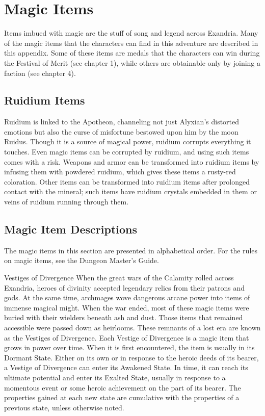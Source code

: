 \documentclass[10pt,a4,twoside,twocolumn,openany,nodeprecatedcode]{dndbook}
\begin{document}
\chapter{Magic Items}
Items imbued with magic are the stuff of song and legend across Exandria. Many of the magic items that the characters can find in this adventure are described in this appendix. Some of these items are medals that the characters can win during the Festival of Merit (see chapter 1), while others are obtainable only by joining a faction (see chapter 4).
\section{Ruidium Items}
Ruidium is linked to the Apotheon, channeling not just Alyxian's distorted emotions but also the curse of misfortune bestowed upon him by the moon Ruidus. Though it is a source of magical power, ruidium corrupts everything it touches. Even magic items can be corrupted by ruidium, and using such items comes with a risk.
Weapons and armor can be transformed into ruidium items by infusing them with powdered ruidium, which gives these items a rusty-red coloration. Other items can be transformed into ruidium items after prolonged contact with the mineral; such items have ruidium crystals embedded in them or veins of ruidium running through them.
\section{Magic Item Descriptions}
The magic items in this section are presented in alphabetical order. For the rules on magic items, see the Dungeon Master's Guide.
\begin{DndComment}{Vestiges of Divergence}
When the great wars of the Calamity rolled across Exandria, heroes of divinity accepted legendary relics from their patrons and gods. At the same time, archmages wove dangerous arcane power into items of immense magical might. When the war ended, most of these magic items were buried with their wielders beneath ash and dust. Those items that remained accessible were passed down as heirlooms. These remnants of a lost era are known as the Vestiges of Divergence.
Each Vestige of Divergence is a magic item that grows in power over time. When it is first encountered, the item is usually in its Dormant State. Either on its own or in response to the heroic deeds of its bearer, a Vestige of Divergence can enter its Awakened State. In time, it can reach its ultimate potential and enter its Exalted State, usually in response to a momentous event or some heroic achievement on the part of its bearer. The properties gained at each new state are cumulative with the properties of a previous state, unless otherwise noted.
\end{DndComment}
\end{document}
